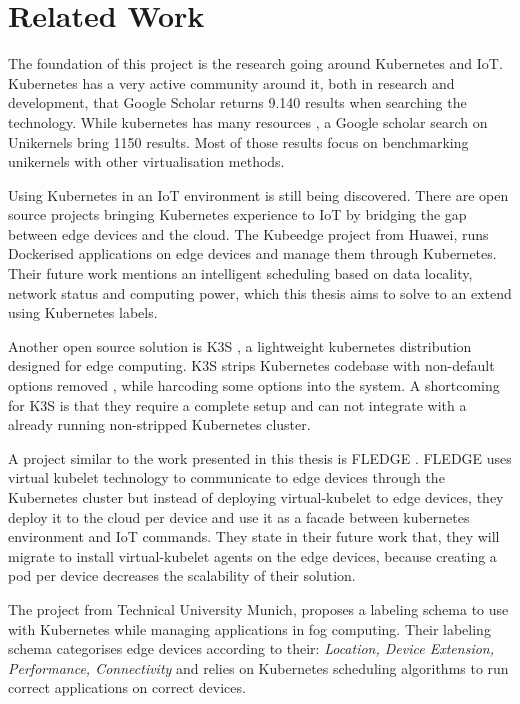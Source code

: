 
\chapter{Related Work}\label{chapter:literature}

The foundation of this project is the research going around Kubernetes and IoT. Kubernetes has a very active community around it, both in research and development, that Google Scholar returns 9.140 results when searching the technology. While kubernetes has many resources , a Google scholar search on Unikernels bring 1150 results. Most of those results focus on benchmarking unikernels with other virtualisation methods.

Using Kubernetes in an IoT environment is still being discovered. There are open source projects bringing Kubernetes experience to IoT by bridging the gap between edge devices and the cloud. The Kubeedge project \cite{kubeedge} from Huawei, runs Dockerised applications on edge devices and manage them through Kubernetes. Their future work mentions an intelligent scheduling based on data locality, network status and computing power, which this thesis aims to solve to an extend using Kubernetes labels.

Another open source solution is K3S \cite{k3s}, a lightweight kubernetes distribution designed for edge computing. K3S strips Kubernetes codebase with non-default options removed , while harcoding some options into the system. A shortcoming for K3S is that they require a complete setup and can not integrate with a already running non-stripped Kubernetes cluster.

A project similar to the work presented in this thesis is FLEDGE \cite{fledge}. FLEDGE uses virtual kubelet technology to communicate to edge devices through the Kubernetes cluster but instead of deploying virtual-kubelet to edge devices, they deploy it to the cloud per device and use it as a facade between kubernetes environment and IoT commands. They state in their future work that, they will migrate to install virtual-kubelet agents on the edge devices, because creating a pod per device decreases the scalability of their solution.

The project \cite{fogernetes} from Technical University Munich, proposes a labeling schema to use with Kubernetes while managing applications in fog computing. Their labeling schema categorises edge devices according to their: \textit{Location, Device Extension, Performance, Connectivity} and relies on Kubernetes scheduling algorithms to run correct applications on correct devices.

